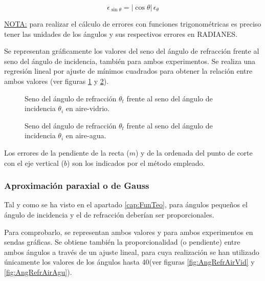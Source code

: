 \documentclass[a4paper,twocolumn]{article}
\begin{document}
            $$ \epsilon_{\sin \theta} = | \cos \theta | \, \epsilon_\theta $$



            \underline{NOTA:} para realizar el cálculo de errores con funciones trigonométricas es preciso tener las unidades de los ángulos y sus respectivos errores en RADIANES.
            
            Se representan gráficamente los valores del seno del ángulo de refracción frente al seno del ángulo de incidencia, también para ambos experimentos. Se realiza una regresión lineal por ajuste de mínimos cuadrados para obtener la relación entre ambos valores (ver figuras \ref{fig:SenAngRefrAirVid} y \ref{fig:SenAngRefrAirAgu}).

        	\begin{figure}[ht!]
            	\centering
            	
            	\caption{Seno del ángulo de refracción $\theta_t$ frente al seno del ángulo de incidencia $\theta_i$ en aire-vidrio.}
        		\label{fig:SenAngRefrAirVid}
            \end{figure}

        	\begin{figure}[ht!]
            	\centering
            	
            	\caption{Seno del ángulo de refracción $\theta_t$ frente al seno del ángulo de incidencia $\theta_i$ en aire-agua.}
        		\label{fig:SenAngRefrAirAgu}
            \end{figure}

            Los errores de la pendiente de la recta ($m$) y de la ordenada del punto de corte con el eje vertical ($b$) son los indicados por el método empleado.
            
        \subsubsection{Aproximación paraxial o de Gauss}

            Tal y como se ha visto en el apartado \ref{cap:FunTeo}, para ángulos pequeños el ángulo de incidencia y el de refracción deberían ser proporcionales.
            
            Para comprobarlo, se representan ambos valores y para ambos experimentos en sendas gráficas. Se obtiene también la proporcionalidad (o pendiente) entre ambos ángulos a través de un ajuste lineal, para cuya realización se han utilizado únicamente los valores de los ángulos hasta 40\textdegree (ver figuras \ref{fig:AngRefrAirVid} y \ref{fig:AngRefrAirAgu}).
            
\end{document}
